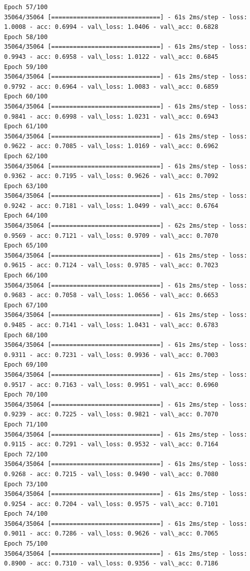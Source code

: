 \documentclass[11pt]{article}
\begin{document}
\begin{Verbatim}[commandchars=\\\{\}]
Epoch 57/100
35064/35064 [==============================] - 61s 2ms/step - loss: 1.0008 - acc: 0.6994 - val\_loss: 1.0406 - val\_acc: 0.6828
Epoch 58/100
35064/35064 [==============================] - 61s 2ms/step - loss: 0.9943 - acc: 0.6958 - val\_loss: 1.0122 - val\_acc: 0.6845
Epoch 59/100
35064/35064 [==============================] - 61s 2ms/step - loss: 0.9792 - acc: 0.6964 - val\_loss: 1.0083 - val\_acc: 0.6859
Epoch 60/100
35064/35064 [==============================] - 61s 2ms/step - loss: 0.9841 - acc: 0.6998 - val\_loss: 1.0231 - val\_acc: 0.6943
Epoch 61/100
35064/35064 [==============================] - 61s 2ms/step - loss: 0.9622 - acc: 0.7085 - val\_loss: 1.0169 - val\_acc: 0.6962
Epoch 62/100
35064/35064 [==============================] - 61s 2ms/step - loss: 0.9362 - acc: 0.7195 - val\_loss: 0.9626 - val\_acc: 0.7092
Epoch 63/100
35064/35064 [==============================] - 61s 2ms/step - loss: 0.9242 - acc: 0.7181 - val\_loss: 1.0499 - val\_acc: 0.6764
Epoch 64/100
35064/35064 [==============================] - 62s 2ms/step - loss: 0.9569 - acc: 0.7121 - val\_loss: 0.9709 - val\_acc: 0.7070
Epoch 65/100
35064/35064 [==============================] - 61s 2ms/step - loss: 0.9615 - acc: 0.7124 - val\_loss: 0.9785 - val\_acc: 0.7023
Epoch 66/100
35064/35064 [==============================] - 61s 2ms/step - loss: 0.9683 - acc: 0.7058 - val\_loss: 1.0656 - val\_acc: 0.6653
Epoch 67/100
35064/35064 [==============================] - 61s 2ms/step - loss: 0.9485 - acc: 0.7141 - val\_loss: 1.0431 - val\_acc: 0.6783
Epoch 68/100
35064/35064 [==============================] - 61s 2ms/step - loss: 0.9311 - acc: 0.7231 - val\_loss: 0.9936 - val\_acc: 0.7003
Epoch 69/100
35064/35064 [==============================] - 61s 2ms/step - loss: 0.9517 - acc: 0.7163 - val\_loss: 0.9951 - val\_acc: 0.6960
Epoch 70/100
35064/35064 [==============================] - 61s 2ms/step - loss: 0.9239 - acc: 0.7225 - val\_loss: 0.9821 - val\_acc: 0.7070
Epoch 71/100
35064/35064 [==============================] - 61s 2ms/step - loss: 0.9115 - acc: 0.7291 - val\_loss: 0.9532 - val\_acc: 0.7164
Epoch 72/100
35064/35064 [==============================] - 61s 2ms/step - loss: 0.9268 - acc: 0.7215 - val\_loss: 0.9490 - val\_acc: 0.7080
Epoch 73/100
35064/35064 [==============================] - 61s 2ms/step - loss: 0.9254 - acc: 0.7204 - val\_loss: 0.9575 - val\_acc: 0.7101
Epoch 74/100
35064/35064 [==============================] - 61s 2ms/step - loss: 0.9011 - acc: 0.7286 - val\_loss: 0.9626 - val\_acc: 0.7065
Epoch 75/100
35064/35064 [==============================] - 61s 2ms/step - loss: 0.8900 - acc: 0.7310 - val\_loss: 0.9356 - val\_acc: 0.7186

\end{Verbatim}
\end{document}
